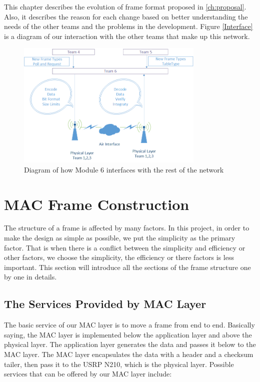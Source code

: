 This chapter describes the evolution of frame format proposed in \ref{ch:proposal}. Also, it describes the reason for each change based on better understanding the needs of the other teams and the problems in the development. Figure \ref{Interface} is a diagram of our interaction with the other teams that make up this network. 
\begin{figure}[ht]
    \centering
    \includegraphics[width=0.8\textwidth]{Interface_diagram.PNG}
    \caption{Diagram of how Module 6 interfaces with the rest of the network}
    \label{fig:Interface}
\end{figure}


\section{MAC Frame Construction}
The structure of a frame is affected by many factors. In this project, in order to make the design as simple as possible, we put the simplicity as the primary factor. That is when there is a conflict between the simplicity and efficiency or other factors, we choose the simplicity, the efficiency or there factors is less important. This section will introduce all the sections of the frame structure one by one in details. 

\subsection{The Services Provided by MAC Layer}

The basic service of our MAC layer is to move a frame from end to end. Basically saying, the MAC layer is implemented below the application layer and above the physical layer. The application layer generates the data and passes it below to the MAC layer. The MAC layer encapsulates the data with a header and a checksum tailer, then pass it to the USRP N210, which is the physical layer. Possible services that can be offered by our MAC layer include: 


